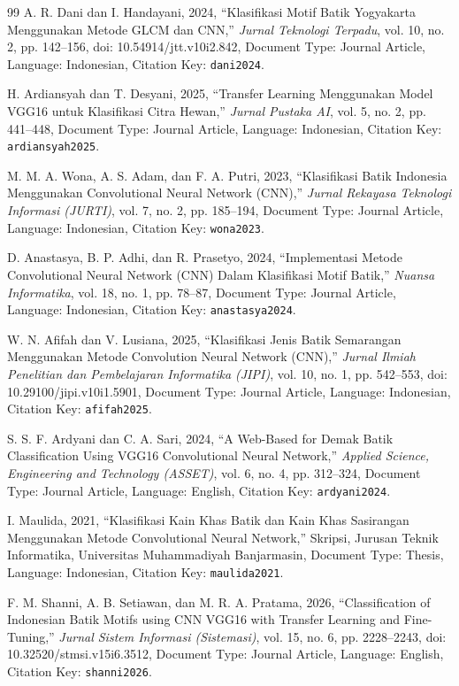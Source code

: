 \documentclass[10pt,a4paper]{article}
\begin{document}
\begin{thebibliography}{99}
A. R. Dani dan I. Handayani, 2024, ``Klasifikasi Motif Batik Yogyakarta Menggunakan Metode GLCM dan CNN,'' \textit{Jurnal Teknologi Terpadu}, vol. 10, no. 2, pp. 142--156, doi: 10.54914/jtt.v10i2.842, Document Type: Journal Article, Language: Indonesian, Citation Key: \texttt{dani2024}.

H. Ardiansyah dan T. Desyani, 2025, ``Transfer Learning Menggunakan Model VGG16 untuk Klasifikasi Citra Hewan,'' \textit{Jurnal Pustaka AI}, vol. 5, no. 2, pp. 441--448, Document Type: Journal Article, Language: Indonesian, Citation Key: \texttt{ardiansyah2025}.

M. M. A. Wona, A. S. Adam, dan F. A. Putri, 2023, ``Klasifikasi Batik Indonesia Menggunakan Convolutional Neural Network (CNN),'' \textit{Jurnal Rekayasa Teknologi Informasi (JURTI)}, vol. 7, no. 2, pp. 185--194, Document Type: Journal Article, Language: Indonesian, Citation Key: \texttt{wona2023}.

D. Anastasya, B. P. Adhi, dan R. Prasetyo, 2024, ``Implementasi Metode Convolutional Neural Network (CNN) Dalam Klasifikasi Motif Batik,'' \textit{Nuansa Informatika}, vol. 18, no. 1, pp. 78--87, Document Type: Journal Article, Language: Indonesian, Citation Key: \texttt{anastasya2024}.

W. N. Afifah dan V. Lusiana, 2025, ``Klasifikasi Jenis Batik Semarangan Menggunakan Metode Convolution Neural Network (CNN),'' \textit{Jurnal Ilmiah Penelitian dan Pembelajaran Informatika (JIPI)}, vol. 10, no. 1, pp. 542--553, doi: 10.29100/jipi.v10i1.5901, Document Type: Journal Article, Language: Indonesian, Citation Key: \texttt{afifah2025}.

S. S. F. Ardyani dan C. A. Sari, 2024, ``A Web-Based for Demak Batik Classification Using VGG16 Convolutional Neural Network,'' \textit{Applied Science, Engineering and Technology (ASSET)}, vol. 6, no. 4, pp. 312--324, Document Type: Journal Article, Language: English, Citation Key: \texttt{ardyani2024}.

I. Maulida, 2021, ``Klasifikasi Kain Khas Batik dan Kain Khas Sasirangan Menggunakan Metode Convolutional Neural Network,'' Skripsi, Jurusan Teknik Informatika, Universitas Muhammadiyah Banjarmasin, Document Type: Thesis, Language: Indonesian, Citation Key: \texttt{maulida2021}.

F. M. Shanni, A. B. Setiawan, dan M. R. A. Pratama, 2026, ``Classification of Indonesian Batik Motifs using CNN VGG16 with Transfer Learning and Fine-Tuning,'' \textit{Jurnal Sistem Informasi (Sistemasi)}, vol. 15, no. 6, pp. 2228--2243, doi: 10.32520/stmsi.v15i6.3512, Document Type: Journal Article, Language: English, Citation Key: \texttt{shanni2026}.


\end{thebibliography}
\end{document}
